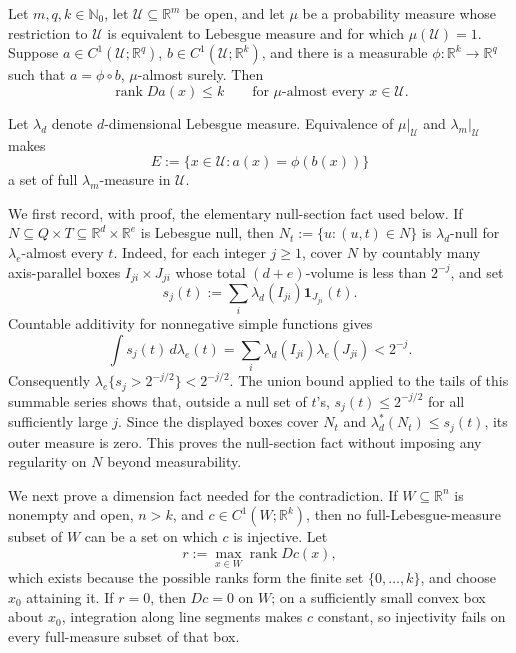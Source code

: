 Let \(m,q,k\in\mathbb N_0\), let \(\mathcal U\subseteq\mathbb R^m\) be open, and let \(\mu\) be a probability measure whose restriction to \(\mathcal U\) is equivalent to Lebesgue measure and for which \(\mu(\mathcal U)=1\).  Suppose \(a\in C^1(\mathcal U;\mathbb R^q)\), \(b\in C^1(\mathcal U;\mathbb R^k)\), and there is a measurable \(\phi:\mathbb R^k\to\mathbb R^q\) such that \(a=\phi\circ b\), \(\mu\)-almost surely.  Then
\[
 \operatorname{rank}Da(x)\leq k
 \qquad\text{for }\mu\text{-almost every }x\in\mathcal U.
\]

Let \(\lambda_d\) denote \(d\)-dimensional Lebesgue measure.  Equivalence of \(\mu|_{\mathcal U}\) and \(\lambda_m|_{\mathcal U}\) makes
\[
 E:=\{x\in\mathcal U:a(x)=\phi(b(x))\}
\]
a set of full \(\lambda_m\)-measure in \(\mathcal U\).

We first record, with proof, the elementary null-section fact used below.  If \(N\subseteq Q\times T\subseteq\mathbb R^d\times\mathbb R^e\) is Lebesgue null, then \(N_t:=\{u:(u,t)\in N\}\) is \(\lambda_d\)-null for \(\lambda_e\)-almost every \(t\).  Indeed, for each integer \(j\geq1\), cover \(N\) by countably many axis-parallel boxes \(I_{ji}\times J_{ji}\) whose total \((d+e)\)-volume is less than \(2^{-j}\), and set
\[
 s_j(t):=\sum_i\lambda_d(I_{ji})\mathbf 1_{J_{ji}}(t).
\]
Countable additivity for nonnegative simple functions gives
\[
 \int s_j(t)\,d\lambda_e(t)
 =\sum_i\lambda_d(I_{ji})\lambda_e(J_{ji})<2^{-j}. \tag{1}
\]
Consequently \(\lambda_e\{s_j>2^{-j/2}\}<2^{-j/2}\).  The union bound applied to the tails of this summable series shows that, outside a null set of \(t\)'s, \(s_j(t)\leq2^{-j/2}\) for all sufficiently large \(j\).  Since the displayed boxes cover \(N_t\) and \(\lambda_d^*(N_t)\leq s_j(t)\), its outer measure is zero.  This proves the null-section fact without imposing any regularity on \(N\) beyond measurability.

We next prove a dimension fact needed for the contradiction.  If \(W\subseteq\mathbb R^n\) is nonempty and open, \(n>k\), and \(c\in C^1(W;\mathbb R^k)\), then no full-Lebesgue-measure subset of \(W\) can be a set on which \(c\) is injective.  Let
\[
 r:=\max_{x\in W}\operatorname{rank}Dc(x),
\]
which exists because the possible ranks form the finite set \(\{0,\ldots,k\}\), and choose \(x_0\) attaining it.  If \(r=0\), then \(Dc=0\) on \(W\); on a sufficiently small convex box about \(x_0\), integration along line segments makes \(c\) constant, so injectivity fails on every full-measure subset of that box.

